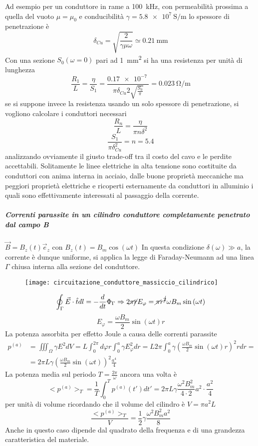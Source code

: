 Ad esempio per un conduttore in rame a \SI{100}{\kilo\hertz}, con permeabilità prossima a quella del vuoto
$\mu = \mu_0 $ e conducibilità $\gamma= \SI{5.8e7}{\siemens\per\meter}$ lo spessore di penetrazione è
$$
\delta_{Cu} = \sqrt{\frac{2}{\gamma\mu\omega}} \simeq \SI{0.21}{\milli\meter}
$$
Con una sezione $S_0(\omega = 0)$ pari ad \SI{1}{\milli\meter^2} si ha una resistenza per unità di lunghezza
$$
\frac{R_1}{L} = \frac{\eta}{S_1} = \frac{\SI{0.17e-7}{}}{\pi\delta_{Cu} 2\sqrt{\frac{S_0}{\pi}}} = \SI{0.023}{\ohm\per\meter}
$$
se si suppone invece la resistenza usando un solo spessore di penetrazione, si vogliono calcolare i conduttori
necessari
$$
\frac{R_n}{L} = \frac{\eta}{\pi n\delta^2}
$$
$$
\frac{S_1}{\pi\delta_{Cu}^2} = n = 5.4
$$
analizzando ovviamente il giusto trade-off tra il costo del cavo e le perdite accettabili. Solitamente le linee 
elettriche in alta tensione sono costituite da conduttori con anima interna in acciaio, dalle buone proprietà
meccaniche ma peggiori proprietà elettriche e ricoperti esternamente da conduttori in alluminio i quali sono
effettivamente interessati al passaggio della corrente.

\subparagraph{Correnti parassite in un cilindro conduttore completamente penetrato dal campo B} $\vec{B} = B_z(t)\vec{e}_z$ con $B_z(t) = B_m\cos\left(\omega t\right)$
In questa condizione $\delta(\omega)\gg a$, la corrente è dunque uniforme, si applica la legge di Faraday-Neumann
ad una linea $\Gamma$ chiusa interna alla sezione del conduttore.
\begin{figure}[H]
\centering
\texttt{[image: circuitazione\_conduttore\_massiccio\_cilindrico]}
\end{figure}
$$
\oint_\Gamma \vec{E}\cdot\hat{t}dl = - \frac{d}{dt}\Phi_\Gamma \Rightarrow 2\cancel{\pi} \cancel{r} E_\varphi = \cancel{\pi} r^{\cancel{2}} \omega B_m\sin\left(\omega t\right)
$$
$$
E_\varphi = \frac{\omega B_m}{2}\sin\left(\omega t\right)r
$$
La potenza assorbita per effetto Joule a causa delle correnti parassite
$$\begin{aligned}
p^{(a)} &= \iiint_\Omega \gamma E^2 dV = L\int_0^{2\pi}d\varphi r \int_0^a\gamma E^2_\varphi dr = L2\pi \int_0^a \gamma \left(\frac{\omega B_m}{2}\sin\left(\omega t\right)r\right)^2rdr =\\
&= 2\pi L \gamma \left(\frac{\omega B_m}{2}\sin\left(\omega t\right)\right)^2\frac{a^4}{4} 
\end{aligned}
$$
La potenza media sul periodo $T = \frac{2\pi}{\omega}$ ancora una volta è
$$
<p^{(a)}>_T = \frac{1}{T} \int_0^T p^{(a)}(t')dt' = 2\pi L\gamma \frac{\omega^2B_m^2}{4\cdot 2} a^2 \cdot \frac{a^2}{4}
$$
per unità di volume ricordando che il volume del cilindro è $V = \pi a^2 L $
$$
\frac{<p^{(a)}>_T }{V} = \frac{1}{2}\gamma\frac{\omega^2B_m^2a^2}{8}
$$
Anche in questo caso dipende dal quadrato della frequenza e di una grandezza caratteristica del materiale.
\newpage
